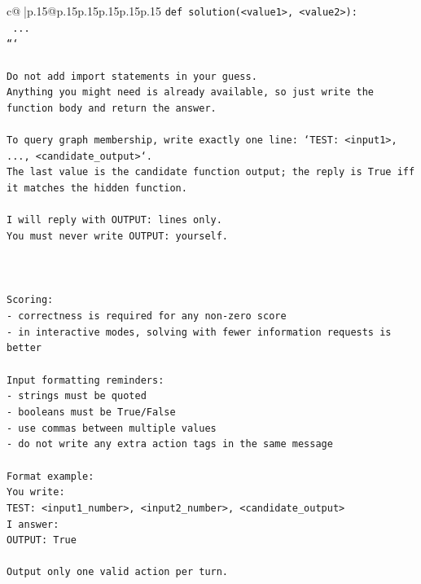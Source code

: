 \documentclass{article}
\begin{document}
{\begin{supertabular}{c@{$\;$}|p{.15\linewidth}@{}p{.15\linewidth}p{.15\linewidth}p{.15\linewidth}p{.15\linewidth}p{.15\linewidth}}
{{{\texttt{def solution(<value1>, <value2>):} \\
\texttt{    ...} \\
\texttt{```} \\
\\ 
\texttt{Do not add import statements in your guess.} \\
\texttt{Anything you might need is already available, so just write the function body and return the answer.} \\
\\ 
\texttt{To query graph membership, write exactly one line: `TEST: <input1>, ..., <candidate\_output>`.} \\
\texttt{The last value is the candidate function output; the reply is True iff it matches the hidden function.} \\
\\ 
\texttt{I will reply with OUTPUT: lines only.} \\
\texttt{You must never write OUTPUT: yourself.} \\
\\ 
\\ 
\\ 
\texttt{Scoring:} \\
\texttt{{-} correctness is required for any non{-}zero score} \\
\texttt{{-} in interactive modes, solving with fewer information requests is better} \\
\\ 
\texttt{Input formatting reminders:} \\
\texttt{{-} strings must be quoted} \\
\texttt{{-} booleans must be True/False} \\
\texttt{{-} use commas between multiple values} \\
\texttt{{-} do not write any extra action tags in the same message} \\
\\ 
\texttt{Format example:} \\
\texttt{You write:} \\
\texttt{TEST: <input1\_number>, <input2\_number>, <candidate\_output>} \\
\texttt{I answer:} \\
\texttt{OUTPUT: True} \\
\\ 
\texttt{Output only one valid action per turn.} \\
            }
        }
    }
     \\ \\


\end{supertabular}}
\end{document}
